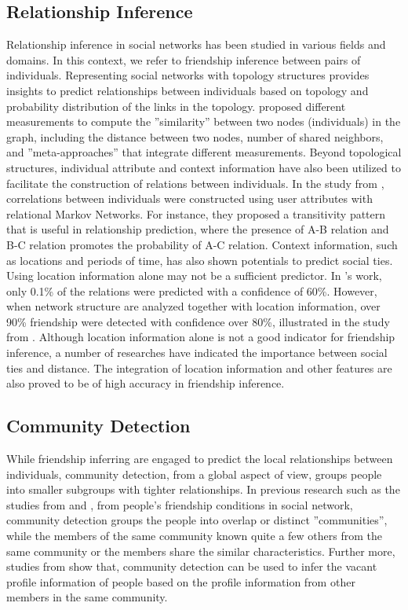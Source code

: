 \documentclass[11pt]{article}
\begin{document}
\subsection{Relationship Inference}
Relationship inference in social networks has been studied in various fields and domains. In this context, we refer to friendship inference between pairs of individuals. Representing social networks with topology structures provides insights to predict relationships  between individuals based on topology and probability distribution of the links in the topology. \cite{liben-nowell_link-prediction_2007} proposed different measurements to compute the ''similarity'' between two nodes (individuals) in the graph, including the distance between two nodes, number of shared neighbors, and ''meta-approaches'' that integrate different measurements. Beyond topological structures, individual attribute and context information have also been utilized to facilitate the construction of relations between individuals. In the study from \cite{taskar_link_2004}, correlations between individuals were constructed using user attributes with relational Markov Networks. For instance, they proposed a transitivity pattern that is useful in relationship prediction, where the presence of A-B relation and B-C relation promotes the probability of A-C relation. Context information, such as locations and periods of time, has also shown potentials to predict social ties. Using location information alone may not be a sufficient predictor. In \cite{crandall_inferring_2010}'s work, only 0.1\% of the relations were predicted with a confidence of 60\%. However, when network structure are analyzed together with location information, over 90\% friendship were detected with confidence over 80\%, illustrated in the study from \cite{sadilek_finding_2012}. Although location information alone is not a good indicator for friendship inference, a number of researches have indicated the importance between social ties and distance. The integration of location information and other features are also proved to be of high accuracy in friendship inference.

\subsection{Community Detection}
While friendship inferring are engaged to predict the  local relationships between individuals, community detection, from a global aspect of view, groups people into smaller subgroups with tighter relationships. In previous research such as the studies from \cite{mislove_you_2010} and \cite{xie_community_2011}, from people's friendship conditions in social network, community detection groups the people into overlap or distinct ''communities'', while the members of the same community known quite a few others from the same community or the members share the similar characteristics. Further more, studies from  \cite{mislove_you_2010} show that, community detection can be used to infer the vacant profile information of people based on the profile information from other members in the same community. 
\end{document}
